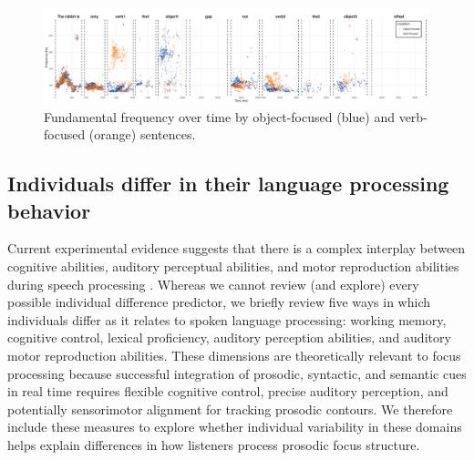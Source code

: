 \begin{figure}[H]  %
    \centering
    \includegraphics[width=\textwidth,height=\textheight,keepaspectratio]{viz/accoustic.png}
    \caption{Fundamental frequency over time by object-focused (blue) and verb-focused (orange) sentences.}
    \label{fig:acoustic}
\end{figure}



\subsection{Individuals differ in their language processing behavior}
Current experimental evidence suggests that there is a complex interplay between cognitive abilities, auditory perceptual abilities, and motor reproduction abilities during speech processing \parencite{saito2022does, bramlett_wiener_24_speechprosody, bakkouche2025effects, Kachlicka_Saito_Tierney_2019}. Whereas we cannot review (and explore) every possible individual difference predictor, we briefly review five ways in which individuals differ as it relates to spoken language processing: working memory, cognitive control, lexical proficiency, auditory perception abilities, and auditory motor reproduction abilities. These dimensions are theoretically relevant to focus processing because successful integration of prosodic, syntactic, and semantic cues in real time requires flexible cognitive control, precise auditory perception, and potentially sensorimotor alignment for tracking prosodic contours. We therefore include these measures to explore whether individual variability in these domains helps explain differences in how listeners process prosodic focus structure.


